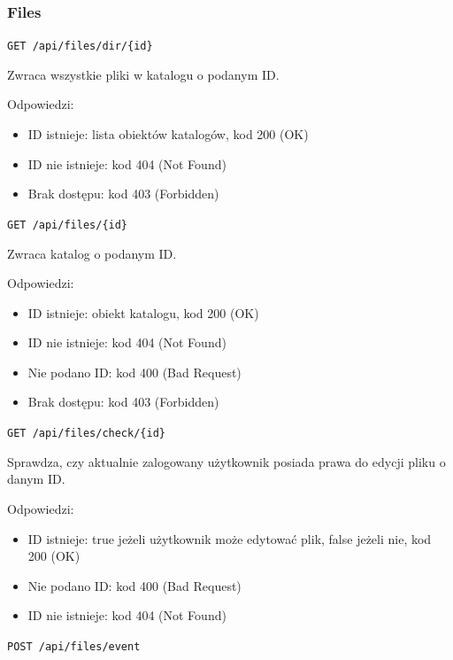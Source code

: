 \documentclass[a4paper,twoside,12pt]{book}
\begin{document}
\subsubsection{Files}\label{files}

\label{get-files-in-directory}

\texttt{GET\ /api/files/dir/\{id\}}

Zwraca wszystkie pliki w katalogu o podanym ID.

Odpowiedzi: 
\begin{itemize}
	\item ID istnieje: lista obiektów katalogów, kod 200 (OK) 
	\item ID nie istnieje: kod 404 (Not Found) 
	\item Brak dostępu: kod 403 (Forbidden)
\end{itemize}

\label{get-file-by-id}

\texttt{GET\ /api/files/\{id\}}

Zwraca katalog o podanym ID.

Odpowiedzi: 
\begin{itemize}
	\item ID istnieje: obiekt katalogu, kod 200 (OK) 
	\item ID nie istnieje: kod 404 (Not Found) 
	\item Nie podano ID: kod 400 (Bad Request) 
	\item Brak dostępu: kod 403 (Forbidden)
\end{itemize}

\label{check-file-edit-access}

\texttt{GET\ /api/files/check/\{id\}}

Sprawdza, czy aktualnie zalogowany użytkownik posiada prawa do edycji pliku o danym ID.

Odpowiedzi: 
\begin{itemize}
	\item ID istnieje: true jeżeli użytkownik może edytować plik, false jeżeli nie, kod 200 (OK) 
	\item  Nie podano ID: kod 400 (Bad Request) 
	\item ID nie istnieje: kod 404 (Not Found)
\end{itemize}

\label{create-event}

\texttt{POST\ /api/files/event}
\end{document}
